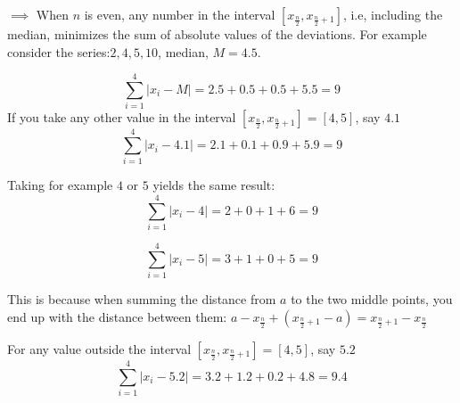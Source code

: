 \documentclass[12pt, letterpaper]{article}
\theoremstyle{definition}
\begin{document}
$\implies$ When $n$ is even, any number in the interval $[x_{\tfrac{n}{2}},x_{\tfrac{n}{2}+1}]$, i.e, including the median, minimizes the sum of absolute values of the deviations. For example consider the series:$2, 4, 5, 10$, median, $M=4.5$.

$$
\sum_{i=1}^4|x_i-M|=2.5+0.5+0.5+5.5=9
$$
If you take any other value in the interval $\left[x_{\tfrac{n}{2}},x_{\tfrac{n}{2} + 1} \right] =[4,5]$, say $4.1$
$$
\sum_{i=1}^4|x_i-4.1|=2.1+0.1+0.9+5.9=9
$$

Taking for example $4$ or $5$ yields the same result:
$$
\sum_{i=1}^4|x_i-4|=2+0+1+6=9
$$

$$
\sum_{i=1}^4|x_i-5|=3+1+0+5=9
$$

This is because when summing the distance from $a$ to the two middle points, you end up with the distance between them: $a-x_{\tfrac{n}{2}}+(x_{\tfrac{n}{2}+1}-a) = x_{\tfrac{n}{2}+1}-x_{\tfrac{n}{2}}$

For any value outside the interval $\left[x_{\tfrac{n}{2}},x_{\tfrac{n}{2}+1}\right]=[4,5]$, say $5.2$
$$
\sum_{i=1}^4|x_i-5.2|=3.2+1.2+0.2+4.8=9.4
$$
\end{document}
